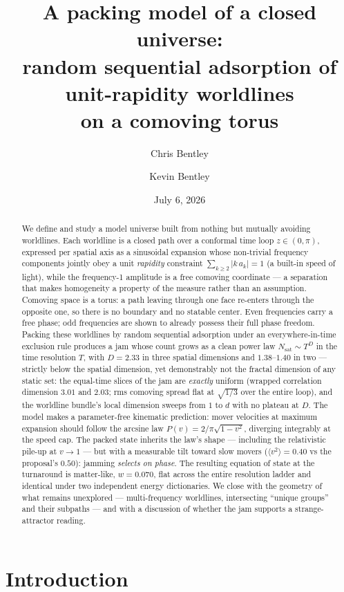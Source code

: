 \documentclass[11pt]{article}
\title{A packing model of a closed universe:\\
random sequential adsorption of unit-rapidity worldlines\\
on a comoving torus}
\author{Chris Bentley \and Kevin Bentley}
\date{July 6, 2026}
\newcommand{\Nsat}{N_{\mathrm{sat}}}
\begin{document}
\maketitle

\begin{abstract}
We define and study a model universe built from nothing but mutually avoiding
worldlines. Each worldline is a closed path over a conformal time loop
$z \in (0,\pi)$, expressed per spatial axis as a sinusoidal expansion whose
non-trivial frequency components jointly obey a unit \emph{rapidity}
constraint $\sum_{k \ge 2} |k\,a_k| = 1$ (a built-in speed of light), while
the frequency-1 amplitude is a free comoving coordinate --- a separation that
makes homogeneity a property of the measure rather than an assumption.
Comoving space is a torus: a path leaving through one face re-enters through
the opposite one, so there is no boundary and no statable center. Even
frequencies carry a free phase; odd frequencies are shown to already possess
their full phase freedom. Packing these worldlines by random sequential
adsorption under an everywhere-in-time exclusion rule produces a jam whose
count grows as a clean power law $\Nsat \sim T^{D}$ in the time resolution
$T$, with $D = 2.33$ in three spatial dimensions and $1.38$--$1.40$ in two
--- strictly below the spatial dimension, yet demonstrably not the fractal
dimension of any static set: the equal-time slices of the jam are
\emph{exactly} uniform (wrapped correlation dimension $3.01$ and $2.03$; rms
comoving spread flat at $\sqrt{1/3}$ over the entire loop), and the worldline
bundle's local dimension sweeps from $1$ to $d$ with no plateau at $D$. The
model makes a parameter-free kinematic prediction: mover velocities at
maximum expansion should follow the arcsine law $P(v) = 2/\pi\sqrt{1-v^2}$,
diverging integrably at the speed cap. The packed state inherits the law's
shape --- including the relativistic pile-up at $v \to 1$ --- but with a
measurable tilt toward slow movers ($\langle v^2\rangle = 0.40$ vs the
proposal's $0.50$): jamming \emph{selects on phase}. The resulting equation
of state at the turnaround is matter-like, $w = 0.070$, flat across the
entire resolution ladder and identical under two independent energy
dictionaries. We close with the geometry of what remains unexplored ---
multi-frequency worldlines, intersecting ``unique groups'' and their
subpaths --- and with a discussion of whether the jam supports a
strange-attractor reading.
\end{abstract}

\section{Introduction}
\end{document}
